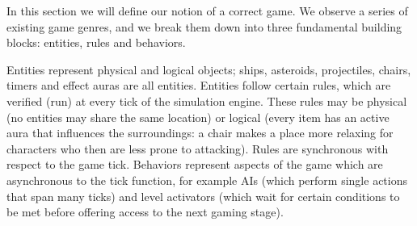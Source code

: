 
In this section we will define our notion of a correct game. We observe a series of existing game genres, and we break them down into three fundamental building blocks: entities, rules and behaviors.

Entities represent physical and logical objects; ships, asteroids, projectiles, chairs, timers and effect auras are all entities. Entities follow certain rules, which are verified (run) at every tick of the simulation engine. These rules may be physical (no entities may share the same location) or logical (every item has an active aura that influences the surroundings: a chair makes a place more relaxing for characters who then are less prone to attacking). Rules are synchronous with respect to the game tick. Behaviors represent aspects of the game which are asynchronous to the tick function, for example AIs (which perform single actions that span many ticks) and level activators (which wait for certain conditions to be met before offering access to the next gaming stage).

